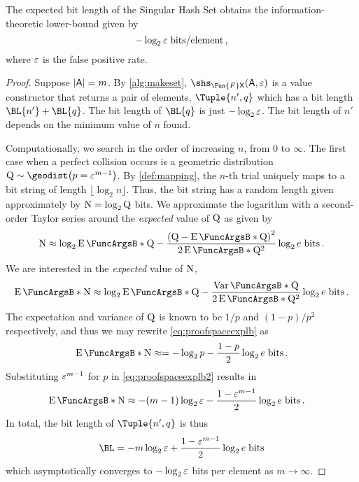 \documentclass[ ../main.tex]{subfiles}
\begin{document}
\begin{theorem}
    The expected bit length of the Singular Hash Set obtains the information-theoretic lower-bound given by
    \begin{equation}
        -\log_2 \fprate \; \si{bits \per element}\,,
    \end{equation}
    where $\fprate$ is the false positive rate.
\end{theorem}
\begin{proof}
    Suppose $\Card{\Set{A}}=m$.
    By \cref{alg:makeset}, $\shs_{\Fun{F} \Set{X}}(\Set{A},\fprate)$ is a value constructor that returns a pair of elements, $\Tuple{n',q}$ which has a bit length $\BL{n'} + \BL{q}$.
    The bit length of $\BL{q}$ is just $-\log_2 \fprate$.
    The bit length of $n'$ depends on the minimum value of $n$ found.
    
    Computationally, we search in the order of increasing $n$, from $0$ to $\infty$.
    The first case when a perfect collision occurs is a geometric distribution $\RV{Q} \sim \geodist \!\left(p = \fprate^{m-1}\right)$.
    By \cref{def:mapping}, the $n$-th trial uniquely maps to a bit string of length $\lfloor \log_2 n \rfloor$.
    Thus, the bit string has a random length given approximately by $\RV{N} = \log_2 \RV{Q}$ bits.
    We approximate the logarithm with a second-order Taylor series around the \emph{expected} value of $\RV{Q}$ as given by
    \begin{equation}
        \RV{N} \approx
        \log_2 \Expect{\RV{Q}} -
        \frac{\left(\RV{Q} - \Expect{\RV{Q}}\right)^2}{2 \Expect{\RV{Q}}^2}        
        \log_2 e\; \si{bits}\,.
    \end{equation}
    We are interested in the \emph{expected} value of $\RV{N}$,
    \begin{equation}
        \label{eq:proofspaceexplb}
        \Expect{\RV{N}} \approx
        \log_2 \Expect{\RV{Q}} -
        \frac{\Var{\RV{Q}}}{2 \Expect{\RV{Q}}^2} \log_2 e \; \si{bits}\,.
    \end{equation}
    The expectation and variance of $\RV{Q}$ is known to be $1/p$ and $(1-p)/p^2$ respectively, and thus we may rewrite \cref{eq:proofspaceexplb} as
    \begin{equation}
        \label{eq:proofspaceexplb2}
        \Expect{\RV{N}} \approx = -\log_2 p - \frac{1-p}{2} \log_2 e \; \si{bits}\,.
    \end{equation} 
    Substituting $\fprate^{m-1}$ for $p$ in \cref{eq:proofspaceexplb2} results in
    \begin{align}
        \Expect{\RV{N}}
        &\approx -(m-1) \log_2 \fprate - \frac{1-\fprate^{m-1}}{2} \log_2 e \; \si{bits}\,.
    \end{align}
    In total, the bit length of $\Tuple{n',q}$ is thus
    \begin{equation}
        \BL = -m \log_2 \fprate +  \frac{1-\fprate^{m-1}}{2} \log_2 e \; \si{bits}
    \end{equation}
    which asymptotically converges to $-\log_2 \fprate$ bits per element as $m \to \infty$.
\end{proof}
\end{document}
